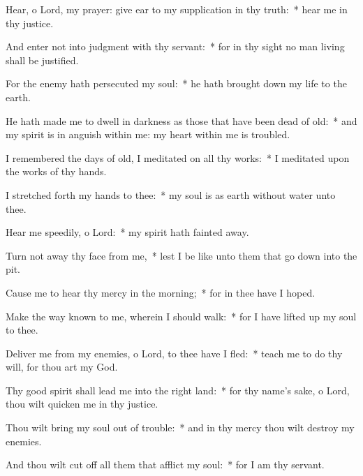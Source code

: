 \begin{enpars}
\item Hear, o Lord, my prayer: give ear to my supplication in thy truth:~* hear me in thy justice.
\item And enter not into judgment with thy servant:~* for in thy sight no man living shall be justified.
\item For the enemy hath persecuted my soul:~* he hath brought down my life to the earth.
\item He hath made me to dwell in darkness as those that have been dead of old:~* and my spirit is in anguish within me: my heart within me is troubled.
\item I remembered the days of old, I meditated on all thy works:~* I meditated upon the works of thy hands.
\item I stretched forth my hands to thee:~* my soul is as earth without water unto thee.
\item Hear me speedily, o Lord:~* my spirit hath fainted away.
\item Turn not away thy face from me,~* lest I be like unto them that go down into the pit.
\item Cause me to hear thy mercy in the morning;~* for in thee have I hoped.
\item Make the way known to me, wherein I should walk:~* for I have lifted up my soul to thee.
\item Deliver me from my enemies, o Lord, to thee have I fled:~* teach me to do thy will, for thou art my God.
\item Thy good spirit shall lead me into the right land:~* for thy name’s sake, o Lord, thou wilt quicken me in thy justice.
\item Thou wilt bring my soul out of trouble:~* and in thy mercy thou wilt destroy my enemies.
\item And thou wilt cut off all them that afflict my soul:~* for I am thy servant.
\end{enpars}